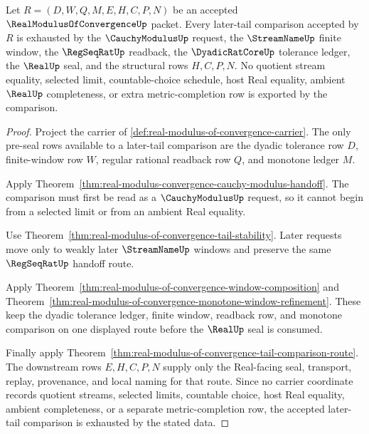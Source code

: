 \begin{theorem}
\label{thm:real-modulus-of-convergence-cauchy-tail-exhaustion}
Let $R=(D,W,Q,M,E,H,C,P,N)$ be an accepted $\RealModulusOfConvergenceUp$ packet. Every later-tail comparison accepted by $R$ is exhausted by the $\CauchyModulusUp$ request, the $\StreamNameUp$ finite window, the $\RegSeqRatUp$ readback, the $\DyadicRatCoreUp$ tolerance ledger, the $\RealUp$ seal, and the structural rows $H,C,P,N$. No quotient stream equality, selected limit, countable-choice schedule, host Real equality, ambient $\RealUp$ completeness, or extra metric-completion row is exported by the comparison.
\end{theorem}
\begin{proof}
Project the carrier of \autoref{def:real-modulus-of-convergence-carrier}. The only pre-seal rows available to a later-tail comparison are the dyadic tolerance row $D$, finite-window row $W$, regular rational readback row $Q$, and monotone ledger $M$.

Apply Theorem~\ref{thm:real-modulus-convergence-cauchy-modulus-handoff}. The comparison must first be read as a $\CauchyModulusUp$ request, so it cannot begin from a selected limit or from an ambient Real equality.

Use Theorem~\ref{thm:real-modulus-of-convergence-tail-stability}. Later requests move only to weakly later $\StreamNameUp$ windows and preserve the same $\RegSeqRatUp$ handoff route.

Apply Theorem~\ref{thm:real-modulus-of-convergence-window-composition} and Theorem~\ref{thm:real-modulus-of-convergence-monotone-window-refinement}. These keep the dyadic tolerance ledger, finite window, readback row, and monotone comparison on one displayed route before the $\RealUp$ seal is consumed.

Finally apply Theorem~\ref{thm:real-modulus-of-convergence-tail-comparison-route}. The downstream rows $E,H,C,P,N$ supply only the Real-facing seal, transport, replay, provenance, and local naming for that route. Since no carrier coordinate records quotient streams, selected limits, countable choice, host Real equality, ambient completeness, or a separate metric-completion row, the accepted later-tail comparison is exhausted by the stated data.
\end{proof}

